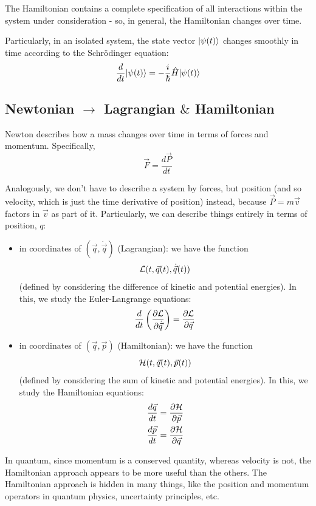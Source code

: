 \documentclass[12pt]{article}
\begin{document}
\begin{proposition}
The Hamiltonian contains a complete specification of all interactions within the system under consideration - so, in general, the Hamiltonian changes over time.

Particularly, in an isolated system, the state vector $\Ket{\psi(t)}$ changes smoothly in time according to the Schrödinger equation: $$
\frac{d}{dt}\Ket{\psi(t)} = - \frac{i}{\hbar}\hat{H}\Ket{\psi(t)}
$$
\end{proposition}

\subsection{Newtonian $\rightarrow$ Lagrangian $\&$ Hamiltonian}
\begin{definition}
Newton describes how a mass changes over time in terms of forces and momentum. Specifically, $$
\vec{F} = \frac{d\vec{P}}{dt}
$$

Analogously, we don't have to describe a system by forces, but position (and so velocity, which is just the time derivative of position) instead, because $\vec{P} = m\vec{v}$ factors in $\vec{v}$ as part of it. Particularly, we can describe things entirely in terms of position, $q$:
\begin{itemize}
    \item in coordinates of $(\vec{q}, \dot{\vec{q}})$ (Lagrangian): we have the function $$
    \LLL(t, \vec{q}(t), \dot{\vec{q}}(t))
    $$ (defined by considering the difference of kinetic and potential energies). In this, we study the Euler-Langrange equations: $$
    \frac{d}{dt}\prt{\frac{\partial \LLL}{\partial \dot{\vec{q}}}} = \frac{\partial \LLL}{\partial \vec{q}}
    $$
    \item in coordinates of $(\vec{q}, \vec{p})$ (Hamiltonian): we have the function $$
    \HHH(t, \vec{q}(t), \vec{p}(t))
    $$ (defined by considering the sum of kinetic and potential energies). In this, we study the Hamiltonian equations: $$
    \begin{aligned}
        \frac{d\vec{q}}{dt} &= \frac{\partial \HHH}{\partial \vec{p}}\\
        \frac{d\vec{p}}{dt} &= \frac{\partial \HHH}{\partial \vec{q}}
    \end{aligned}
    $$
\end{itemize}
\end{definition}

\begin{remark}
In quantum, since momentum is a conserved quantity, whereas velocity is not, the Hamiltonian approach appears to be more useful than the others. The Hamiltonian approach is hidden in many things, like the position and momentum operators in quantum physics, uncertainty principles, etc.
\end{remark}
\end{document}
